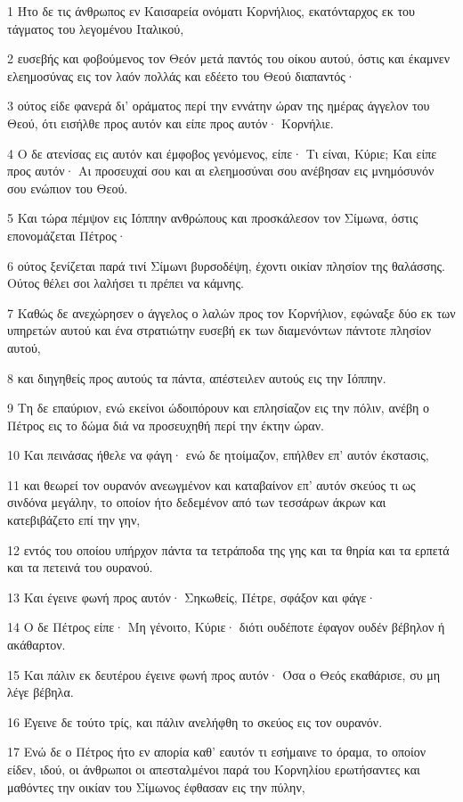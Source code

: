 \par 1 Ήτο δε τις άνθρωπος εν Καισαρεία ονόματι Κορνήλιος, εκατόνταρχος εκ του τάγματος του λεγομένου Ιταλικού,
\par 2 ευσεβής και φοβούμενος τον Θεόν μετά παντός του οίκου αυτού, όστις και έκαμνεν ελεημοσύνας εις τον λαόν πολλάς και εδέετο του Θεού διαπαντός·
\par 3 ούτος είδε φανερά δι' οράματος περί την εννάτην ώραν της ημέρας άγγελον του Θεού, ότι εισήλθε προς αυτόν και είπε προς αυτόν· Κορνήλιε.
\par 4 Ο δε ατενίσας εις αυτόν και έμφοβος γενόμενος, είπε· Τι είναι, Κύριε; Και είπε προς αυτόν· Αι προσευχαί σου και αι ελεημοσύναι σου ανέβησαν εις μνημόσυνόν σου ενώπιον του Θεού.
\par 5 Και τώρα πέμψον εις Ιόππην ανθρώπους και προσκάλεσον τον Σίμωνα, όστις επονομάζεται Πέτρος·
\par 6 ούτος ξενίζεται παρά τινί Σίμωνι βυρσοδέψη, έχοντι οικίαν πλησίον της θαλάσσης. Ούτος θέλει σοι λαλήσει τι πρέπει να κάμνης.
\par 7 Καθώς δε ανεχώρησεν ο άγγελος ο λαλών προς τον Κορνήλιον, εφώναξε δύο εκ των υπηρετών αυτού και ένα στρατιώτην ευσεβή εκ των διαμενόντων πάντοτε πλησίον αυτού,
\par 8 και διηγηθείς προς αυτούς τα πάντα, απέστειλεν αυτούς εις την Ιόππην.
\par 9 Τη δε επαύριον, ενώ εκείνοι ώδοιπόρουν και επλησίαζον εις την πόλιν, ανέβη ο Πέτρος εις το δώμα διά να προσευχηθή περί την έκτην ώραν.
\par 10 Και πεινάσας ήθελε να φάγη· ενώ δε ητοίμαζον, επήλθεν επ' αυτόν έκστασις,
\par 11 και θεωρεί τον ουρανόν ανεωγμένον και καταβαίνον επ' αυτόν σκεύος τι ως σινδόνα μεγάλην, το οποίον ήτο δεδεμένον από των τεσσάρων άκρων και κατεβιβάζετο επί την γην,
\par 12 εντός του οποίου υπήρχον πάντα τα τετράποδα της γης και τα θηρία και τα ερπετά και τα πετεινά του ουρανού.
\par 13 Και έγεινε φωνή προς αυτόν· Σηκωθείς, Πέτρε, σφάξον και φάγε·
\par 14 Ο δε Πέτρος είπε· Μη γένοιτο, Κύριε· διότι ουδέποτε έφαγον ουδέν βέβηλον ή ακάθαρτον.
\par 15 Και πάλιν εκ δευτέρου έγεινε φωνή προς αυτόν· Όσα ο Θεός εκαθάρισε, συ μη λέγε βέβηλα.
\par 16 Έγεινε δε τούτο τρίς, και πάλιν ανελήφθη το σκεύος εις τον ουρανόν.
\par 17 Ενώ δε ο Πέτρος ήτο εν απορία καθ' εαυτόν τι εσήμαινε το όραμα, το οποίον είδεν, ιδού, οι άνθρωποι οι απεσταλμένοι παρά του Κορνηλίου ερωτήσαντες και μαθόντες την οικίαν του Σίμωνος έφθασαν εις την πύλην,
